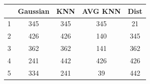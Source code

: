 \begin{center}
\begin{tabular}{|r|c|c|c|c|}
\hline
  & Gaussian & KNN & AVG KNN & Dist \\ \hline
1 & 345      & 345 & 345     & 21 \\ \hline
2 & 426      & 426 & 140     & 345 \\ \hline
3 & 362      & 362 & 141     & 362 \\ \hline
4 & 241      & 442 & 426     & 426 \\ \hline
5 & 334      & 241 & 39      & 442 \\ \hline
\end{tabular}
\end{center}